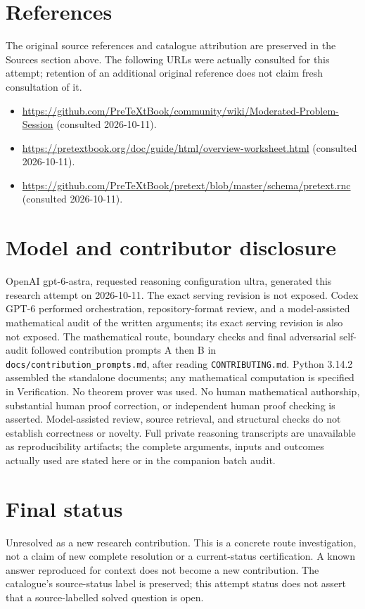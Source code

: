 \documentclass[11pt]{article}
\begin{document}
\section{References}
The original source references and catalogue attribution are preserved in the
Sources section above. The following URLs were actually consulted for this attempt;
retention of an additional original reference does not claim fresh consultation of it.
\begin{itemize}
\item \url{https://github.com/PreTeXtBook/community/wiki/Moderated-Problem-Session} (consulted 2026-10-11). 
\item \url{https://pretextbook.org/doc/guide/html/overview-worksheet.html} (consulted 2026-10-11). 
\item \url{https://github.com/PreTeXtBook/pretext/blob/master/schema/pretext.rnc} (consulted 2026-10-11). 
\end{itemize}
\section{Model and contributor disclosure}
OpenAI gpt-6-astra, requested reasoning configuration ultra, generated this research
attempt on 2026-10-11. The exact serving revision is not exposed. Codex GPT-6
performed orchestration, repository-format review, and a model-assisted mathematical
audit of the written arguments; its exact serving revision
is also not exposed. The mathematical route, boundary checks and final adversarial
self-audit followed contribution prompts A then B in
\texttt{docs/contribution\_prompts.md}, after reading \texttt{CONTRIBUTING.md}.
Python 3.14.2 assembled the standalone documents; any mathematical computation is
specified in Verification. No theorem prover was used. No human mathematical
authorship, substantial human proof correction, or independent human proof checking
is asserted. Model-assisted review, source retrieval, and structural checks do not
establish correctness or novelty. Full private reasoning transcripts are unavailable
as reproducibility artifacts; the complete arguments, inputs and outcomes actually
used are stated here or in the companion batch audit.
\section{Final status}
Unresolved as a new research contribution. This is a concrete route investigation,
not a claim of new complete resolution or a current-status certification. A known
answer reproduced for context does not become a new contribution. The catalogue's
source-status label is preserved; this attempt status does not assert that a
source-labelled solved question is open.
\end{document}
